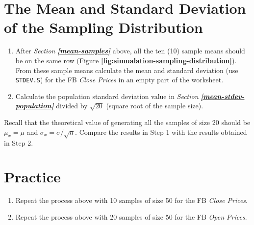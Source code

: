 \documentclass[
  12pt,
  letterpaper,
]{book}
\providecommand{\tightlist}{%
  \setlength{\itemsep}{0pt}\setlength{\parskip}{0pt}}
\begin{document}
\hypertarget{the-mean-and-standard-deviation-of-the-sampling-distribution}{%
\section{The Mean and Standard Deviation of the Sampling Distribution}\label{the-mean-and-standard-deviation-of-the-sampling-distribution}}

\begin{enumerate}
\def\labelenumi{\arabic{enumi}.}
\item
  After \emph{Section} \textbf{\emph{\ref{mean-samples}}} above, all the ten (10) sample means should be on the same row (Figure \textbf{\ref{fig:simualation-sampling-distribution}}). From these sample means calculate the mean and standard deviation (use \texttt{STDEV.S}) for the FB \emph{Close Prices} in an empty part of the worksheet.
\item
  Calculate the population standard deviation value in \emph{Section} \textbf{\emph{\ref{mean-stdev-population}}} divided by \(\sqrt{20}\) (square root of the sample size).
\end{enumerate}

Recall that the theoretical value of generating all the samples of size 20 should be \(\mu_{\bar{x}}=\mu\) and \(\sigma_{\bar{x}}=\sigma/\sqrt{n}\). Compare the results in Step 1 with the results obtained in Step 2.

\hypertarget{practice-10}{%
\section{Practice}\label{practice-10}}

\begin{enumerate}
\def\labelenumi{\arabic{enumi}.}
\tightlist
\item
  Repeat the process above with 10 samples of size 50 for the FB \emph{Close Prices}.
\item
  Repeat the process above with 20 samples of size 50 for the FB \emph{Open Prices}.
\end{enumerate}

  
\end{document}
